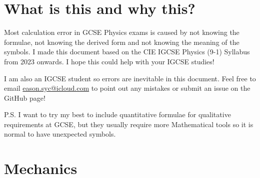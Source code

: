 \documentclass[8pt]{article}
\author{\Author}
\title{\Title}
\date{Version 1. \Date}
\begin{document}
	\maketitle

	\tableofcontents

    \section*{What is this and why this?}
        Most calculation error in GCSE Physics exams is caused by not knowing the formulae, not knowing the derived form and not knowing the meaning of the symbols. I made this document based on the CIE IGCSE Physics (9-1) Syllabus from 2023 onwards. I hope this could help with your IGCSE studies!

        I am also an IGCSE student so errors are inevitable in this document. Feel free to email \href{eason.syc@icloud.com}{eason.syc@icloud.com} to point out any mistakes or submit an issue on the GitHub page!

        P.S. I want to try my best to include quantitative formulae for qualitative requirements at GCSE, but they usually require more Mathematical tools so it is normal to have unexpected symbols.

    \section{Mechanics}
\end{document}
